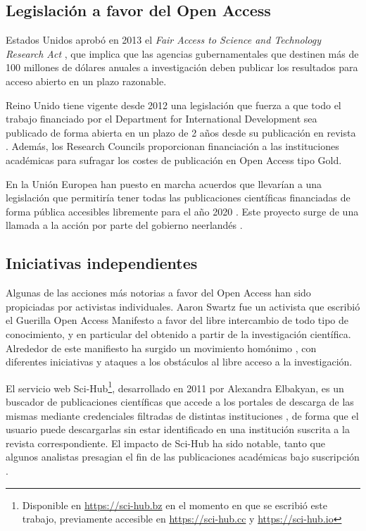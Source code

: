 
\subsection{Legislación a favor del Open Access}


Estados Unidos aprobó en 2013 el \textit{Fair Access to Science and Technology Research Act} \cite{fastr}, que implica que las agencias gubernamentales que destinen más de 100 millones de dólares anuales a investigación deben publicar los resultados para acceso abierto en un plazo razonable. %

Reino Unido tiene vigente desde 2012 una legislación que fuerza a que todo el trabajo financiado por el Department for International Development sea publicado de forma abierta en un plazo de 2 años desde su publicación en revista \cite{ukdifd}. Además, los Research Councils proporcionan financiación a las instituciones académicas para sufragar los costes de publicación en Open Access tipo Gold\cite{rcuk}.

En la Unión Europea han puesto en marcha acuerdos que llevarían a una legislación que permitiría tener todas las publicaciones científicas financiadas de forma pública accesibles libremente para el año 2020 \cite{enserink2016dramatic}. Este proyecto surge de una llamada a la acción por parte del gobierno neerlandés \cite{amsterdam}.

\subsection{Iniciativas independientes}

Algunas de las acciones más notorias a favor del Open Access han sido propiciadas por activistas individuales. Aaron Swartz fue un activista que escribió el Guerilla Open Access Manifesto \cite{goam} a favor del libre intercambio de todo tipo de conocimiento, y en particular del obtenido a partir de la investigación científica. Alrededor de este manifiesto ha surgido un movimiento homónimo \cite{pirates}, con diferentes iniciativas y ataques a los obstáculos al libre acceso a la investigación.

El servicio web Sci-Hub\footnote{Disponible en \url{https://sci-hub.bz} en el momento en que se escribió este trabajo, previamente accesible en \url{https://sci-hub.cc} y \url{https://sci-hub.io}}, desarrollado en 2011 por Alexandra Elbakyan, es un buscador de publicaciones científicas que accede a los portales de descarga de las mismas mediante credenciales filtradas de distintas instituciones \cite{himmelstein-scihub}, de forma que el usuario puede descargarlas sin estar identificado en una institución suscrita a la revista correspondiente. El impacto de Sci-Hub ha sido notable, tanto que algunos analistas presagian el fin de las publicaciones académicas bajo suscripción \cite{sciencescihub}.

